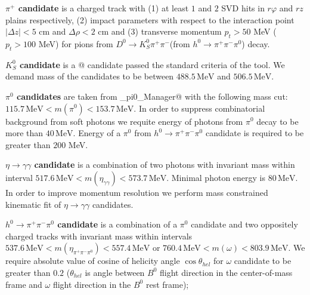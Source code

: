 \documentclass[preprint,aps,showpacs]{revtex4}
\newcommand{\dkspp}{\ensuremath{D^0\to K_S^0\pi^+\pi^-}\xspace}
\newcommand{\etagg}{\ensuremath{\eta\to\gamma\gamma}\xspace}
\newcommand{\hppp}{\ensuremath{h^0\to\pi^+\pi^-\pi^0}\xspace}
\begin{document}
{\bf \boldmath$\pi^{+}$ candidate} is a charged track with (1) at least $1$ and $2$ SVD hits in $r\varphi$ and $rz$ plains respectively, (2) impact parameters with respect to the interaction point $\left|\Delta z\right|<5$ cm and $\Delta\rho<2$ cm and (3) transverse momentum $p_t>50$ MeV ($p_t>100$ MeV) for pions from \dkspp (from \hppp) decay.

{\bf \boldmath$K_S^0$ candidate} is a @ candidate passed the standard criteria of the \verb@nisKsFinder@ tool. We demand mass of the candidates to be between $488.5\,\text{MeV}$ and $506.5\,\text{MeV}$.

{\bf \boldmath$\pi^0$ candidates} are taken from \verb@Mdst_pi0_Manager@ with the following mass cut: $115.7\,\text{MeV}<m(\pi^0)<153.7\,\text{MeV}$. In order to suppress combinatorial background from soft photons we requite energy of photons from $\pi^0$ decay to be more than $40\,\text{MeV}$. Energy of a $\pi^0$ from \hppp candidate is required to be greater than $200$ MeV.

{\bf \boldmath$\eta\to\gamma\gamma$ candidate} is a combination of two photons with invariant mass within interval $517.6\,\text{MeV}<m(\eta_{\gamma\gamma})<573.7\,\text{MeV}$. Minimal photon energy is $80\,\text{MeV}$. In order to improve momentum resolution we perform mass constrained kinematic fit of $\etagg$ candidates.

{\bf \boldmath$h^0\to\pi^+\pi^-\pi^0$ candidate} is a combination of a $\pi^0$ candidate and two oppositely charged tracks with invariant mass within intervals $537.6\,\text{MeV}<m(\eta_{\pi^+\pi^-\pi^0})<557.4\,\text{MeV}$ or $760.4\,\text{MeV}<m(\omega)<803.9\,\text{MeV}$. We require absolute value of cosine of helicity angle $\cos\theta_{hel}$ for $\omega$ candidate to be greater than $0.2$ ($\theta_{hel}$ is angle between $B^0$ flight direction in the center-of-mass frame and $\omega$ flight direction in the $B^0$ rest frame);
\end{document}
